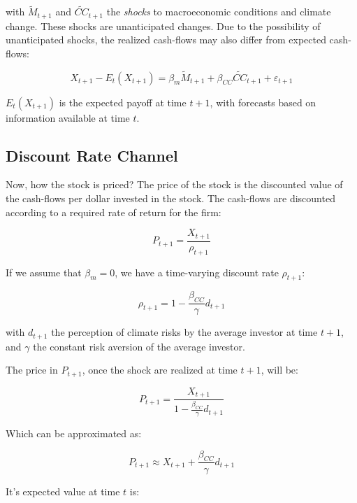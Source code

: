 with $\tilde{M}_{t+1}$ and $\tilde{CC}_{t+1}$ the \textit{shocks} to macroeconomic conditions 
and climate change. These shocks are unanticipated
changes.
Due to the possibility of unanticipated shocks,
the realized cash-flows may also differ from expected cash-flows:

\begin{equation}
    X_{t+1} - E_{t}(X_{t+1}) = \beta_m \tilde{M}_{t+1} + \beta_{CC} \tilde{CC}_{t+1} + \varepsilon_{t+1}
\end{equation}

$E_t(X_{t+1})$ is the expected payoff at time $t+1$,
with forecasts based on information available at time $t$.

\subsection{Discount Rate Channel}

Now, how the stock is priced? 
The price of the stock is the discounted value of the 
cash-flows per dollar invested in the stock.
The cash-flows are discounted according 
to a required rate of return for the firm:

\begin{equation}
    P_{t+1} = \frac{X_{t+1}}{\rho_{t+1}}
\end{equation}

If we assume that $\beta_m = 0$,
we have a time-varying discount rate $\rho_{t+1}$:

\begin{equation}
    \rho_{t+1} = 1 - \frac{\beta_{CC}}{\gamma} d_{t+1}
\end{equation}

with $d_{t+1}$ the perception of climate 
risks by the average investor at time $t+1$,
and $\gamma$ the constant risk aversion of 
the average investor.

The price in $P_{t+1}$, once 
the shock are realized at time $t+1$, will be:

\begin{equation}
    P_{t+1} = \frac{X_{t+1}}{1 - \frac{\beta_{CC}}{\gamma}d_{t+1}}
\end{equation}

Which can be approximated as:

\begin{equation}
    P_{t+1} \approx X_{t+1} + \frac{\beta_{CC}}{\gamma}d_{t+1}
\end{equation}

It's expected value at time $t$ is:

